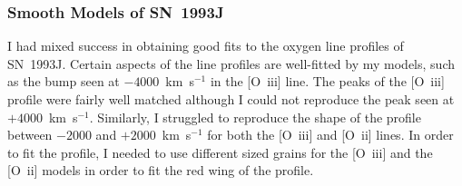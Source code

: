 \subsubsection{Smooth Models of SN~1993J}
I had mixed success in obtaining good fits to the oxygen line profiles of SN~1993J.  Certain aspects of the line profiles are well-fitted by my models, such as the bump seen at $-4000$~km~s$^{-1}$ in the [O~{\sc iii}] line.  The peaks of the [O~{\sc iii}] profile were fairly well matched although I could not reproduce the peak seen at $+4000$~km~s$^{-1}$.  Similarly, I struggled to reproduce the shape of the profile between $-2000$ and $+2000$~km~s$^{-1}$ for both the [O~{\sc iii}] and [O~{\sc ii}] lines.  In order to fit the profile, I needed to use different sized grains for the [O~{\sc iii}] and the [O~{\sc ii}] models in order to fit the red wing of the profile.

